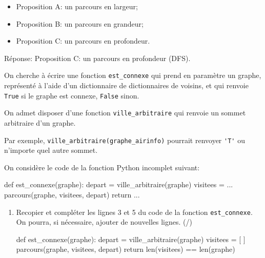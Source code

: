 \begin{enumerate}[resume=monDS]
\begin{minipage}{0.48\linewidth}
    \begin{itemize}[label=$\square$]
    \item Proposition A\@:  un parcours en largeur;
    \item Proposition B\@: un parcours en grandeur;
    \item Proposition C\@: un parcours en profondeur.
\end{itemize}
\end{minipage}\hfill{}
\begin{minipage}{0.48\linewidth}
    \begin{blocvisible}[height=1.5]
    Réponse: Proposition C\@: un parcours en profondeur (DFS).
    \end{blocvisible}
\end{minipage}



\end{enumerate}


\medskip

On cherche à écrire une fonction \texttt{est\_connexe} qui prend en paramètre un graphe, représenté à l'aide d'un dictionnaire de dictionnaires de voisins, et qui renvoie \texttt{True} si le graphe est connexe, \texttt{False} sinon.

On admet disposer d'une fonction \texttt{ville\_arbitraire} qui renvoie un sommet arbitraire d'un graphe.

Par exemple, \texttt{ville\_arbitraire(graphe\_airinfo)} pourrait renvoyer \verb|'T'| ou n'importe quel autre sommet.

On considère le code de la fonction Python incomplet suivant:

\begin{CodePythontexAlt}[TaillePolice=\large, Largeur=1\linewidth,Centre,Lignes=true,PremLigne=1]{}
def est_connexe(graphe):
    depart = ville_arbitraire(graphe)
    visitees = ...
    parcours(graphe, visitees, depart)  
    return ...
\end{CodePythontexAlt}

\begin{enumerate}[resume=monDS]
    \item Recopier et compléter les lignes 3 et 5 du code de la fonction \texttt{est\_connexe}. On pourra, si nécessaire, ajouter de nouvelles lignes. (/)

\begin{blocvisible}[height=3.5]
\begin{CodePythontexAlt}[TaillePolice=\large, Largeur=1\linewidth,Centre,Lignes=true,PremLigne=1]{}
def est_connexe(graphe):
    depart = ville_arbitraire(graphe)
    visitees = [ ]
    parcours(graphe, visitees, depart)
    return len(visitees) == len(graphe)
\end{CodePythontexAlt}
\end{blocvisible}

\end{enumerate}
\pagebreak


